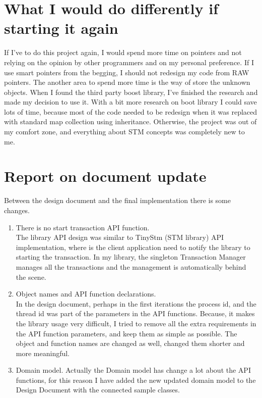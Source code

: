 \documentclass[12pt]{article}
\begin{document}
\section{What I would do differently if starting it again}
If I've to do this project again, I would spend more time on pointers and not relying on the opinion by other programmers and on my personal preference. If I use smart pointers from the begging, I should not redesign my code from RAW pointers. The another area to spend more time is the way of store the unknown objects. When I found the third party boost library, I've finished the research  and made my decision to use it. With a bit more research on boot library I could save lots of time, because most of the code needed to be redesign when it was replaced with standard map collection using inheritance. Otherwise, the project was out of my comfort zone, and everything about STM concepts was completely new to me.\\

\section{Report on document update}
Between the design document and the final implementation there is some changes.
\begin{enumerate}
\item There is no start transaction API function.\\
The library API design was similar to TinyStm (STM library) API implementation, where is the client application need to notify the library to starting the transaction. In my library, the singleton Transaction Manager manages all the transactions and the management is automatically behind the scene.  
\item Object names and API function declarations.\\
In the design document, perhaps in the first iterations the process id, and the thread id was part of the parameters in the API functions. Because, it makes the library usage very difficult, I tried to remove all the extra requirements in the API function parameters, and keep them as simple as possible. The object and function names are changed as well, changed them shorter and more meaningful.
\item Domain model.
Actually the Domain model has change a lot about the API functions, for this reason I have added the new updated domain model to the Design Document with the connected sample classes. 
\end{enumerate}
\end{document}
